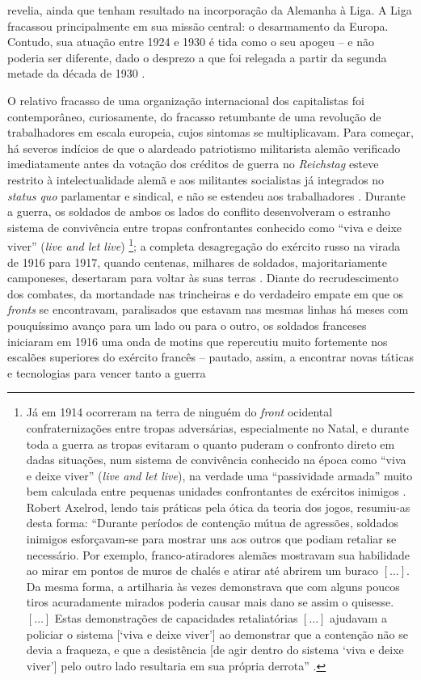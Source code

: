 revelia, ainda que tenham resultado na incorporação da Alemanha à Liga. A Liga fracassou principalmente em sua missão central: o desarmamento da Europa. Contudo, sua atuação entre 1924 e 1930 é tida como o seu apogeu  -- e não poderia ser diferente, dado o desprezo a que foi relegada a partir da segunda metade da década de 1930 \cite{carr_relations_1937,carr_crisis_1981}.

O relativo fracasso de uma organização internacional dos capitalistas foi contemporâneo, curiosamente, do fracasso retumbante de uma revolução de trabalhadores em escala europeia, cujos sintomas se multiplicavam. Para começar, há severos indícios de que o alardeado patriotismo militarista alemão verificado imediatamente antes da votação dos créditos de guerra no \textit{Reichstag} esteve restrito à intelectualidade alemã e aos militantes socialistas já integrados no \textit{status quo} parlamentar e sindical, e não se estendeu aos trabalhadores \cite{broue_german_2005,watson_german_2011}. Durante a guerra, os soldados de ambos os lados do conflito desenvolveram o estranho sistema de convivência entre tropas confrontantes conhecido como ``viva e deixe viver'' (\textit{live and let live}) \cite{ashworth_live_1980}\footnote{Já em 1914 ocorreram na terra de ninguém do \textit{front} ocidental confraternizações entre tropas adversárias, especialmente no Natal, e durante toda a guerra as tropas evitaram o quanto puderam o confronto direto em dadas situações, num sistema de convivência conhecido na época como ``viva e deixe viver'' (\textit{live and let live}), na verdade uma ``passividade armada'' muito bem calculada entre pequenas unidades confrontantes de exércitos inimigos \cite{ashworth_live_1980}. Robert Axelrod, lendo tais práticas pela ótica da teoria dos jogos, resumiu-as desta forma: ``Durante períodos de contenção mútua de agressões, soldados inimigos esforçavam-se para mostrar uns aos outros que podiam retaliar se necessário. Por exemplo, franco-atiradores alemães mostravam sua habilidade ao mirar em pontos de muros de chalés e atirar até abrirem um buraco \([\dots]\). Da mesma forma, a artilharia às vezes demonstrava que com alguns poucos tiros acuradamente mirados poderia causar mais dano se assim o quisesse. \([\dots]\) Estas demonstrações de capacidades retaliatórias \([\dots]\) ajudavam a policiar o sistema [‘viva e deixe viver’] ao demonstrar que a contenção não se devia a fraqueza, e que a desistência [de agir dentro do sistema ‘viva e deixe viver’] pelo outro lado resultaria em sua própria derrota'' \cite[p.~79-80]{axelrod_cooperation_2006}.}; a completa desagregação do exército russo na virada de 1916 para 1917, quando centenas, milhares de soldados, majoritariamente camponeses, desertaram para voltar às suas terras \cite{trotsky_revrus01_1977}. Diante do recrudescimento dos combates, da mortandade nas trincheiras e do verdadeiro empate em que os \textit{fronts} se encontravam, paralisados que estavam nas mesmas linhas há meses com pouquíssimo avanço para um lado ou para o outro, os soldados franceses iniciaram em 1916 uma onda de motins \cite{masson_franceses_2008} que repercutiu muito fortemente nos escalões superiores do exército francês -- pautado, assim, a encontrar novas táticas e tecnologias para vencer tanto a guerra 